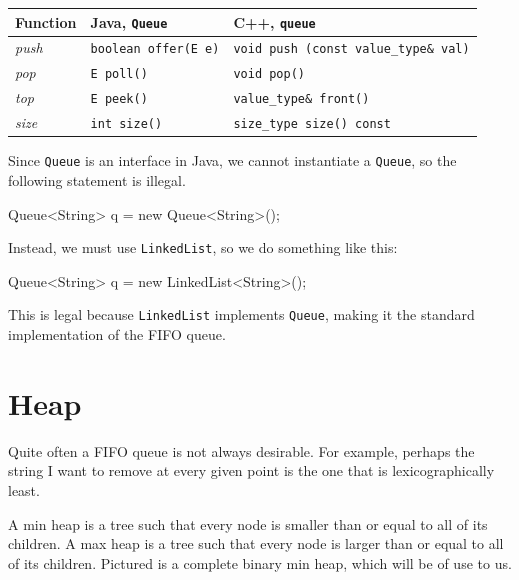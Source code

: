 \begin{center}
  \begin{tabular}{ | p{5cm} | p{5cm} | p{5cm} | }
    \hline
    \textbf{Function}	&	\textbf{Java, \texttt{Queue}}	&	\textbf{C++, \texttt{queue}} \\ \hline
    \textit{push}		&	\texttt{boolean offer(E e)}	&	\texttt{void push (const value\_type\& val)} \\ \hline
    \textit{pop}			&	\texttt{E poll()}		&	\texttt{void pop()}	\\ \hline
    \textit{top}		&	\texttt{E peek()}		&	\texttt{value\_type\& front()}	\\ \hline
    \textit{size} & \texttt{int size()} & \texttt{size\_type size() const} \\ \hline
  \end{tabular}
\end{center}

Since \texttt{Queue} is an interface in Java, we cannot instantiate a \texttt{Queue}, so the following statement is illegal.

\begin{mylstlisting}
Queue<String> q = new Queue<String>();
\end{mylstlisting}

Instead, we must use \texttt{LinkedList}, so we do something like this:

\begin{mylstlisting}
Queue<String> q = new LinkedList<String>();
\end{mylstlisting}

This is legal because \texttt{LinkedList} implements \texttt{Queue}, making it the standard implementation of the FIFO queue.

\section{Heap}

Quite often a FIFO queue is not always desirable. For example, perhaps the string I want to remove at every given point is the one that is lexicographically least.

A min heap is a tree such that every node is smaller than or equal to all of its children. A max heap is a tree such that every node is larger than or equal to all of its children. Pictured is a complete binary min heap, which will be of use to us.

